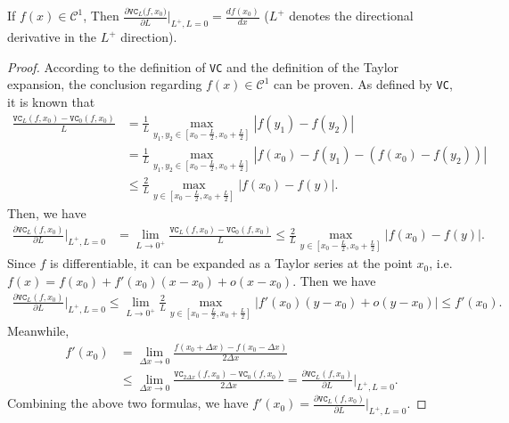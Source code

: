 \documentclass[10pt,a4paper]{amsart}
\begin{document}
\begin{proposition}
If $f({x})\in\mathcal{C}^1$, Then $\frac{\partial\texttt{VC}_L(f,{x_0)}}{\partial L}\Big|_{L^+,L=0}=\frac{df(x_0)}{dx}$ ($L^+$ denotes the directional derivative in the $L^+$ direction). 
\end{proposition}

\begin{proof}
According to the definition of \texttt{VC} and the definition of the Taylor expansion, the conclusion regarding $f(x)\in\mathcal{C}^1$ can be  proven. As defined by \texttt{VC}, it is known that
\[\begin{aligned}
\frac{\texttt{VC}_L(f,x_0)-\texttt{VC}_0(f,x_0)}{L}
&=\frac{1}{L}\max_{y_1,y_2\in[x_0-\frac{L}{2},x_0+\frac{L}{2}]}|f(y_1)-f(y_2)|\\
&=\frac{1}{L}\max_{y_1,y_2\in[x_0-\frac{L}{2},x_0+\frac{L}{2}]}|f(x_0)-f(y_1)-(f(x_0)-f(y_2))|\\
&\leq\frac{2}{L}\max_{y\in[x_0-\frac{L}{2},x_0+\frac{L}{2}]}|f(x_0)-f(y)|.
\end{aligned}\]
Then, we have 
\[\begin{aligned}
\frac{\partial\texttt{VC}_L(f,x_0)}{\partial L}\Big|_{L^+,L=0}
&=\lim_{L\rightarrow0^+}\frac{\texttt{VC}_L(f,x_0)-\texttt{VC}_0(f,x_0)}{L} \leq\frac{2}{L}\max_{y\in[x_0-\frac{L}{2},x_0+\frac{L}{2}]}|f(x_0)-f(y)|.
\end{aligned}\]
Since $f$ is differentiable, it can be expanded as a Taylor series at the point $x_0$, i.e. $f(x)=f(x_0)+f'(x_0)(x-x_0)+o(x-x_0)$. Then we have
\[\begin{aligned}
\frac{\partial\texttt{VC}_L(f,x_0)}{\partial L}\Big|_{L^+,L=0} \leq\lim_{L\rightarrow0^+}\frac{2}{L}\max_{y\in[x_0-\frac{L}{2},x_0+\frac{L}{2}]}|f'(x_0)(y-x_0)+o(y-x_0)| \leq f'(x_0).
\end{aligned}\]
Meanwhile, 
\[\begin{aligned}
f'(x_0)&=\lim_{\Delta x\rightarrow0}\frac{f(x_0+\Delta x)-f(x_0-\Delta x)}{2\Delta x}\\
&\leq\lim_{\Delta x\rightarrow0}\frac{\texttt{VC}_{2\Delta x}(f,x_0)-\texttt{VC}_0(f,x_0)}{2\Delta x}=\frac{\partial\texttt{VC}_L(f,x_0)}{\partial L}\Big|_{L^+,L=0}.        
\end{aligned}\]
Combining the above two formulas, we have 
\(
f'(x_0)=\frac{\partial\texttt{VC}_L(f,x_0)}{\partial L}\Big|_{L^+,L=0}.
\)
\end{proof}
\end{document}

